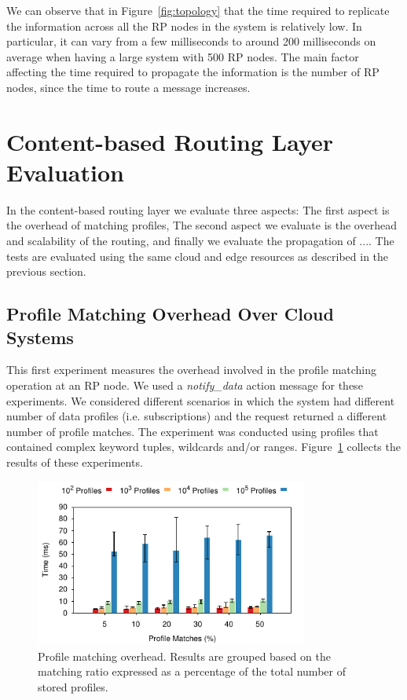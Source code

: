 We can observe that in Figure~\ref{fig:topology} that the time required to replicate the information across all the RP nodes in the system is relatively low. In particular, it can vary from a few milliseconds to around 200 milliseconds on average when having a large system with 500 RP nodes. The main factor affecting the time required to propagate the information is the number of RP nodes, since the time to route a message increases. 

\section{Content-based Routing Layer Evaluation}

In the content-based routing layer we evaluate three aspects: The first aspect is the overhead of matching profiles, The second aspect we evaluate is the overhead and scalability of the routing, and finally we evaluate the propagation of ....  The tests are evaluated using the same cloud and edge resources as described in the previous section.

\subsection{Profile Matching Overhead Over Cloud Systems}

This first experiment measures the overhead involved in the profile matching operation at an RP node. We used a {\it notify\_data} action message for these experiments. We considered different scenarios in which the system had different number of data profiles (i.e. subscriptions) and the request returned a different number of profile matches. %
The experiment was conducted using profiles that contained complex keyword tuples, wildcards and/or ranges. Figure~\ref{fig:profileQuery} collects the results of these experiments. 

\begin{figure}[htb!]
  \centering
    \includegraphics[width=0.8\textwidth]{Figures/profileQuery.pdf}
  \caption{Profile matching overhead. Results are grouped based on the matching ratio expressed as a percentage of the total number of stored profiles.} \label{fig:profileQuery}
\end{figure}

